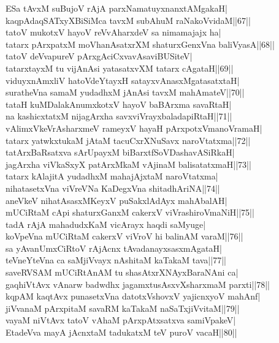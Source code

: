 \documentclass{article}
\begin{document}
ESa tAvxM suBujoV rAjA parxNamatuyxnanxtAMgakaH|\\
kaqpAdaqSATxyXBiSiMca tavxM subAhuM raNakoVvidaM||67||\\
tatoV mukotxV hayoV reVvAharxdeV sa nimamajajx ha|\\
tatarx pArxpatxM moVhanAsatxrXM shaturxGenxVna baliVyasA||68||\\
tatoV deVvapureV pArxgAciCxvavAsaviBUSiteV|\\
tatarxtayxM tu vijAnAsi yatasatxvXM tatarx cAgataH||69||\\
viduyxnAmxliV hatoVdeYtayxH satayxvAnasxMgatasatxtaH|\\
suratheVna samaM yudadhxM jAnAsi tavxM mahAmateV||70||\\
tataH kuMDalakAnumxkotxV hayoV baBArxma savaRtaH|\\
na kashicxtatxM nijagArxha savxviVrayxbaladapiRtaH||71||\\
vAlimxVkeVrAsharxmeV rameyxV hayaH pArxpotxVmanoVramaH|\\
tatarx yatwkxtukaM jAtaM tacuCxrXNuSavx naroVtatxma||72||\\
tatArxBaRsatxva sArUpayxM biBarxtfSoVDashavASiRkaH|\\
jagArxha viVkaSxyX patArxMkaM vAjinaM balisatatxmaH||73||\\
tatarx kAlajitA yudadhxM mahajAjxtaM naroVtatxma|\\
nihatasetxVna viVreVNa KaDegxVna shitadhAriNA||74||\\
aneVkeV nihatAsasxMKeyxV puSakxlAdAyx mahAbalAH|\\
mUCiRtaM cApi shaturxGanxM cakerxV viVrashiroVmaNiH||75||\\
tadA rAjA mahadudxKaM vicArayx haqdi saMyuge|\\
koVpeVna mUCiRtaM cakerxV viVroV hi balinAM varaM||76||\\
sa yAvanUmxCiRtoV rAjAcnx tAvadanayxsasxmAgataH|\\
teVneYteVna ca saMjiVvayx nAshitaM kaTakaM tava||77||\\
saveRVSAM mUCiRtAnAM tu shasAtxrXNAyxBaraNAni ca|\\
gaqhiVtAvx vAnarw badwdhx jagamxtusAsxvXsharxmaM parxti||78||\\
kqpAM kaqtAvx punasetxVna datotxVshovxV yajicnxyoV mahAnf|\\
jiVvanaM pArxpitaM savaRM kaTakaM naSaTxjiVvitaM||79||\\
vayaM niVtAvx tatoV vAhaM pArxpAtxsatxva samiVpakeV|\\
EtadeVva mayA jAcnxtaM tadukatxM teV puroV vacaH||80||\\
\end{document}
